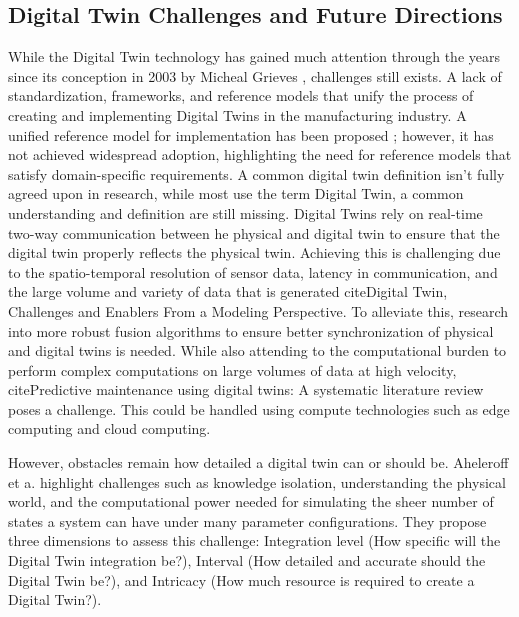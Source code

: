 \subsection{Digital Twin Challenges and Future Directions}
While the Digital Twin technology has gained much attention through the years since its conception in 2003 by Micheal Grieves \cite{TAO2019653}, challenges still exists. A lack of standardization, frameworks, and reference models that unify the process of creating and implementing Digital Twins in the manufacturing industry. A unified reference model for implementation has been proposed \cite{AHELEROFF2021101225}; however, it has not achieved widespread adoption, highlighting the need for reference models that satisfy domain-specific requirements. A common digital twin definition isn't fully agreed upon in research, while most use the term Digital Twin, a common understanding and definition are still missing. Digital Twins rely on real-time two-way communication between he physical and digital twin to ensure that the digital twin properly reflects the physical twin. Achieving this is challenging due to the spatio-temporal resolution of sensor data, latency in communication, and the large volume and variety of data that is generated cite{Digital Twin, Challenges and Enablers From a Modeling Perspective}. To alleviate this, research into more robust fusion algorithms to ensure better synchronization of physical and digital twins is needed. While also attending to the computational burden to perform complex computations on large volumes of data at high velocity, cite{Predictive maintenance using digital twins: A systematic literature review} poses a challenge. This could be handled using compute technologies such as edge computing and cloud computing.

However, obstacles remain how detailed a digital twin can or should be. Aheleroff et a. \cite{AHELEROFF2021101225} highlight challenges such as knowledge isolation, understanding the physical world, and the computational power needed for simulating the sheer number of states a system can have under many parameter configurations. They propose three dimensions to assess this challenge: Integration level (How specific will the Digital Twin integration be?), Interval (How detailed and accurate should the Digital Twin be?), and Intricacy (How much resource is required to create a Digital Twin?).  %

